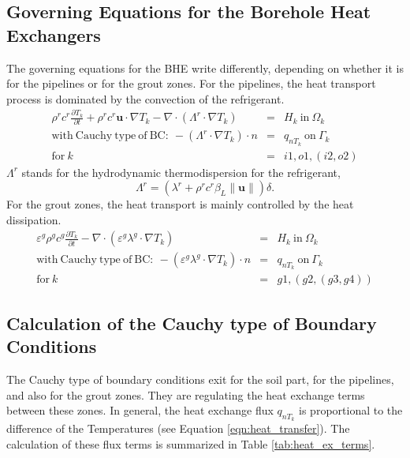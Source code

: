 \subsection{Governing Equations for the Borehole Heat Exchangers}
The governing equations for the BHE write differently, depending on whether it is for the pipelines or for the grout zones. For the pipelines, the heat transport process is dominated by the convection of the refrigerant. 
\begin{eqnarray}
\label{eqn:gov_eqn_bhe_pipe}
\rho^r c^r \frac{\partial T_k}{\partial t} 
+ \rho^r c^r \mathbf{u} \cdot \nabla T_k 
- \nabla \cdot \left( \Lambda^r \cdot \nabla T_k \right)
&=& H_k \mathrm{~in~} \Omega_k \nonumber \\
\mathrm{with~Cauchy~type~of~BC:~} -\left( \Lambda^r \cdot \nabla T_k \right) \cdot n 
&=& q_{nT_k} \mathrm{~on~} \Gamma_k   \nonumber \\
\mathrm{for~} k &=& i1, o1, (i2, o2) 
\end{eqnarray}
$\Lambda^r$ stands for the hydrodynamic thermodispersion for the refrigerant,  
\begin{equation}
\Lambda^r= \left( \lambda^r + \rho^r c^r \beta_L \| \bm{u} \| \right) \delta. 
\end{equation}
For the grout zones, the heat transport is mainly controlled by the heat dissipation. 
\begin{eqnarray}
\label{eqn:gov_eqn_bhe_grout}
\varepsilon^g \rho^g c^g \frac{\partial T_k}{\partial t} 
- \nabla \cdot \left( \varepsilon^g \lambda^g \cdot \nabla T_k \right)
&=& H_k \mathrm{~in~} \Omega_k \nonumber \\
\mathrm{with~Cauchy~type~of~BC:~} -\left( \varepsilon^g \lambda^g \cdot \nabla T_k \right) \cdot n 
&=& q_{nT_k} \mathrm{~on~} \Gamma_k   \nonumber \\
\mathrm{for~} k &=& g1, (g2, (g3, g4)) 
\end{eqnarray}

\subsection{Calculation of the Cauchy type of Boundary Conditions}
The Cauchy type of boundary conditions exit for the soil part, for the pipelines, and also for the grout zones. They are regulating the heat exchange terms between these zones. In general, the heat exchange flux $q_{nT_k}$ is proportional to the difference of the Temperatures (see Equation \ref{eqn:heat_transfer}). The calculation of these flux terms is summarized in Table \ref{tab:heat_ex_terms}. 

